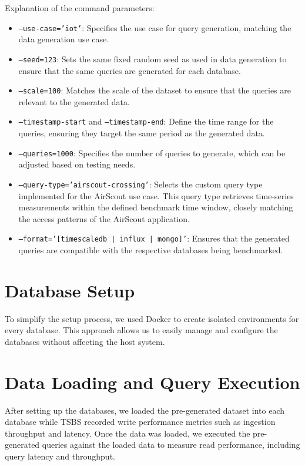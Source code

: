 Explanation of the command parameters:

\begin{itemize}
    \item \texttt{--use-case='iot'}: Specifies the use case for query generation, matching the data generation use case.
    \item \texttt{--seed=123}: Sets the same fixed random seed as used in data generation to ensure that the same queries are generated for each database.
    \item \texttt{--scale=100}: Matches the scale of the dataset to ensure that the queries are relevant to the generated data.
    \item \texttt{--timestamp-start} and \texttt{--timestamp-end}: Define the time range for the queries, ensuring they target the same period as the generated data.
    \item \texttt{--queries=1000}: Specifies the number of queries to generate, which can be adjusted based on testing needs.
    \item \texttt{--query-type='airscout-crossing'}: Selects the custom query type implemented for the AirScout use case. This query type retrieves time-series measurements within the defined benchmark time window, closely matching the access patterns of the AirScout application.
    \item \texttt{--format='[timescaledb | influx | mongo]'}: Ensures that the generated \\
          queries are compatible with the respective databases being benchmarked.
\end{itemize}

\section{Database Setup}

To simplify the setup process, we used Docker to create isolated environments
for every database. This approach allows us to easily manage and configure the
databases without affecting the host system.

\section{Data Loading and Query Execution}

After setting up the databases, we loaded the pre-generated dataset into each
database while TSBS recorded write performance metrics such as ingestion
throughput and latency. Once the data was loaded, we executed the pre-generated
queries against the loaded data to measure read performance, including query
latency and throughput.


